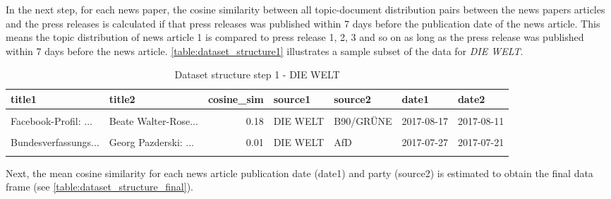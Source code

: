 \documentclass[
]{article}
\begin{document}
In the next step, for each news paper, the cosine similarity between all
topic-document distribution pairs between the news papers articles and
the press releases is calculated if that press releases was published
within 7 days before the publication date of the news article. This
means the topic distribution of news article 1 is compared to press
release 1, 2, 3 and so on as long as the press release was published
within 7 days before the news article.
\autoref{table:dataset_structure1} illustrates a sample subset of the
data for \emph{DIE WELT}.

\begin{table}[H]

\caption{\label{tab:Dataset structure 1}Dataset structure step 1 - DIE WELT \label{table:dataset_structure1}}
\centering
\fontsize{7}{9}\selectfont
\begin{tabular}[t]{llrllll}
\toprule
title1 & title2 & cosine\_sim & source1 & source2 & date1 & date2\\
\midrule
\cellcolor{gray!6}{Bundestagswahlkam...} & \cellcolor{gray!6}{Tag der Bundesweh...} & \cellcolor{gray!6}{0.08} & \cellcolor{gray!6}{DIE WELT} & \cellcolor{gray!6}{DIE LINKE} & \cellcolor{gray!6}{2017-06-12} & \cellcolor{gray!6}{2017-06-09}\\
Facebook-Profil: ... & Beate Walter-Rose... & 0.18 & DIE WELT & B90/GRÜNE & 2017-08-17 & 2017-08-11\\
\cellcolor{gray!6}{Umfrage: Scheiter...} & \cellcolor{gray!6}{Alice Weidel: Jam...} & \cellcolor{gray!6}{0.11} & \cellcolor{gray!6}{DIE WELT} & \cellcolor{gray!6}{AfD} & \cellcolor{gray!6}{2017-11-19} & \cellcolor{gray!6}{2017-11-15}\\
Bundesverfassungs... & Georg Pazderski: ... & 0.01 & DIE WELT & AfD & 2017-07-27 & 2017-07-21\\
\cellcolor{gray!6}{Insa-Umfrage: SPD...} & \cellcolor{gray!6}{Gerold Otten: Geg...} & \cellcolor{gray!6}{0.01} & \cellcolor{gray!6}{DIE WELT} & \cellcolor{gray!6}{AfD} & \cellcolor{gray!6}{2018-01-16} & \cellcolor{gray!6}{2018-01-15}\\
\bottomrule
\end{tabular}
\end{table}

Next, the mean cosine similarity for each news article publication date
(date1) and party (source2) is estimated to obtain the final data frame
(see \autoref{table:dataset_structure_final}).
\end{document}
